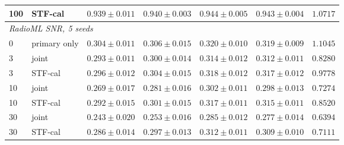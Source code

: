 \begin{table}[t]
\begin{tabular}{llrrrrr}
100 & STF-cal & $0.939\pm0.011$ & $0.940\pm0.003$ & $0.944\pm0.005$ & $0.943\pm0.004$ & $1.0717$ \\
\midrule
\multicolumn{7}{l}{\textit{RadioML SNR, 5 seeds}} \\
$0$ & primary only & $0.304\pm0.011$ & $0.306\pm0.015$ & $0.320\pm0.010$ & $0.319\pm0.009$ & $1.1045$ \\
3 & joint & $0.293\pm0.011$ & $0.300\pm0.014$ & $0.314\pm0.012$ & $0.312\pm0.011$ & $0.8280$ \\
3 & STF-cal & $0.296\pm0.012$ & $0.304\pm0.015$ & $0.318\pm0.012$ & $0.317\pm0.012$ & $0.9778$ \\
10 & joint & $0.269\pm0.017$ & $0.281\pm0.016$ & $0.302\pm0.011$ & $0.298\pm0.013$ & $0.7274$ \\
10 & STF-cal & $0.292\pm0.015$ & $0.301\pm0.015$ & $0.317\pm0.011$ & $0.315\pm0.011$ & $0.8520$ \\
30 & joint & $0.243\pm0.020$ & $0.253\pm0.016$ & $0.285\pm0.012$ & $0.277\pm0.014$ & $0.6394$ \\
30 & STF-cal & $0.286\pm0.014$ & $0.297\pm0.013$ & $0.312\pm0.011$ & $0.309\pm0.010$ & $0.7111$ \\
\bottomrule
\end{tabular}
\end{table}
